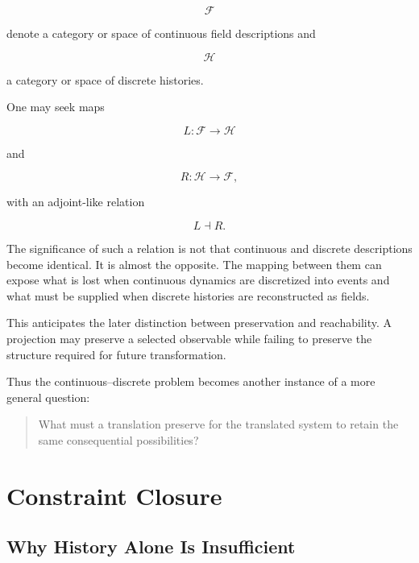 \documentclass[11pt]{article}
\theoremstyle{remark}
\begin{document}
\begin{equation}
\mathcal{F}
\end{equation}

denote a category or space of continuous field descriptions and

\begin{equation}
\mathcal{H}
\end{equation}

a category or space of discrete histories.

One may seek maps

\begin{equation}
L:\mathcal{F}\rightarrow\mathcal{H}
\end{equation}

and

\begin{equation}
R:\mathcal{H}\rightarrow\mathcal{F},
\end{equation}

with an adjoint-like relation

\begin{equation}
L\dashv R.
\end{equation}

The significance of such a relation is not that continuous and discrete descriptions become identical. It is almost the opposite. The mapping between them can expose what is lost when continuous dynamics are discretized into events and what must be supplied when discrete histories are reconstructed as fields.

This anticipates the later distinction between preservation and reachability. A projection may preserve a selected observable while failing to preserve the structure required for future transformation.

Thus the continuous--discrete problem becomes another instance of a more general question:

\begin{quote}
What must a translation preserve for the translated system to retain the same consequential possibilities?
\end{quote}

\section{Constraint Closure}

\subsection{Why History Alone Is Insufficient}
\end{document}
